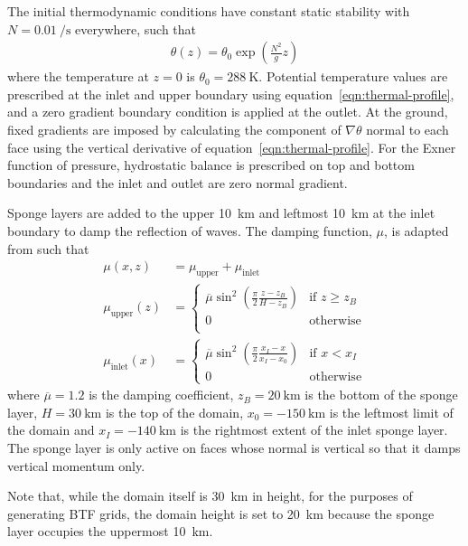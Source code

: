 \documentclass{ametsoc}
\begin{document}
The initial thermodynamic conditions have constant static stability with $N = \SI{0.01}{\per\second}$ everywhere, such that
\begin{align}
	\theta(z) = \theta_0 \exp \left( \frac{N^2}{g} z \right) \label{eqn:thermal-profile}
\end{align}
where the temperature at $z=0$ is $\theta_0 = \SI{288}{\kelvin}$.
Potential temperature values are prescribed at the inlet and upper boundary using equation~\ref{eqn:thermal-profile}, and a zero gradient boundary condition is applied at the outlet.  At the ground, fixed gradients are imposed by calculating the component of $\nabla \theta$ normal to each face using the vertical derivative of equation~\ref{eqn:thermal-profile}.
For the Exner function of pressure, hydrostatic balance is prescribed on top and bottom boundaries and the inlet and outlet are zero normal gradient.

Sponge layers are added to the upper \SI{10}{\kilo\meter} and leftmost \SI{10}{\kilo\meter} at the inlet boundary to damp the reflection of waves.
The damping function, \(\mu\), is adapted from \citet{melvin2010} such that
\begin{align}
	\mu(x, z) &= \mu_\mathrm{upper} + \mu_\mathrm{inlet} \\
	\mu_\mathrm{upper}(z) &= \begin{cases}
		\overline{\mu} \sin^2 \left( \frac{\pi}{2} \frac{z - z_B}{H - z_B} \right) & \text{if } z \geq z_B \\
		0 & \text{otherwise} \\
	\end{cases} \\
	\mu_\mathrm{inlet}(x) &= \begin{cases}
		\overline{\mu} \sin^2 \left( \frac{\pi}{2} \frac{x_I - x}{x_I - x_0} \right) & \text{if } x < x_I \\
		0 & \text{otherwise}
	\end{cases}
\end{align}
where $\overline{\mu} = 1.2$ is the damping coefficient, $z_B = \SI{20}{\kilo\meter}$ is the bottom of the sponge layer, $H = \SI{30}{\kilo\meter}$ is the top of the domain, $x_0 = \SI{-150}{\kilo\meter}$ is the leftmost limit of the domain and $x_I = \SI{-140}{\kilo\meter}$ is the rightmost extent of the inlet sponge layer.  The sponge layer is only active on faces whose normal is vertical so that it damps vertical momentum only.

Note that, while the domain itself is \SI{30}{\kilo\meter} in height, for the purposes of generating BTF grids, the domain height is set to \SI{20}{\kilo\meter} because the sponge layer occupies the uppermost \SI{10}{\kilo\meter}.
\end{document}
